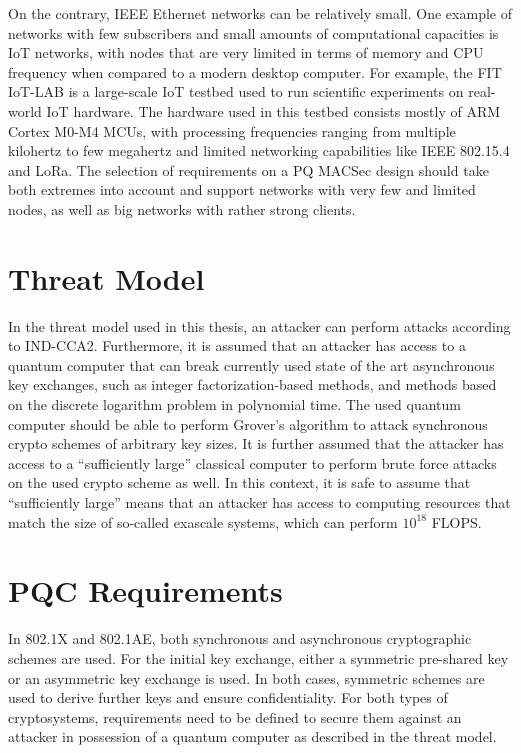 On the contrary, IEEE Ethernet networks can be relatively small. One example of networks with few subscribers and small amounts of computational capacities is \ac{IoT} networks, with nodes that are very limited in terms of memory and \acs{CPU} frequency when compared to a modern desktop computer. For example, the FIT IoT-LAB is a large-scale \ac{IoT} testbed used to run scientific experiments on real-world \ac{IoT} hardware. The hardware used in this testbed consists mostly of ARM Cortex M0-M4 \acp{MCU}, with processing frequencies ranging from multiple kilohertz to few megahertz and limited networking capabilities like IEEE 802.15.4	and LoRa\cite{adjih:hal-01213938}. The selection of requirements on a \ac{PQ} MACSec design should take both extremes into account and support networks with very few and limited nodes, as well as big networks with rather strong clients.


\section{Threat Model}
In the threat model used in this thesis, an attacker can perform attacks according to IND-CCA2. Furthermore, it is assumed that an attacker has access to a quantum computer that can break currently used state of the art asynchronous key exchanges, such as integer factorization-based methods, and methods based on the discrete logarithm problem in polynomial time. The used quantum computer should be able to perform Grover's algorithm to attack synchronous crypto schemes of arbitrary key sizes. It is further assumed that the attacker has access to a ``sufficiently large'' classical computer to perform brute force attacks on the used crypto scheme as well. In this context, it is safe to assume that ``sufficiently large'' means that an attacker has access to computing resources that match the size of so-called exascale systems, which can perform \(10^{18}\) \ac{FLOPS}.

\section{PQC Requirements}

In 802.1X and 802.1AE, both synchronous and asynchronous cryptographic schemes are used. For the initial key exchange, either a symmetric pre-shared key or an asymmetric key exchange is used. In both cases, symmetric schemes are used to derive further keys and ensure confidentiality. For both types of cryptosystems, requirements need to be defined to secure them against an attacker in possession of a quantum computer as described in the threat model. 


